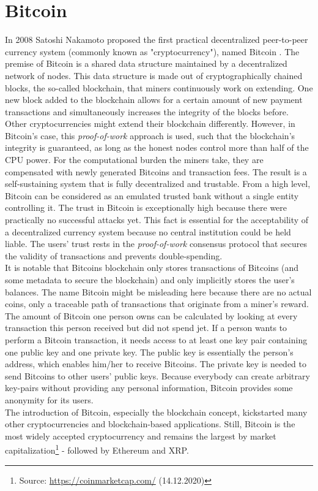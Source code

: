 \documentclass{cacthesis}
\newcounter{protocol}
\begin{document}
        \section{Bitcoin}
        In 2008 Satoshi Nakamoto proposed the first practical decentralized peer-to-peer currency system (commonly known as "cryptocurrency"), named Bitcoin \cite{nakamoto2009bitcoin}. The premise of Bitcoin is a shared data structure maintained by a decentralized network of nodes. This data structure is made out of cryptographically chained blocks, the so-called blockchain, that miners continuously work on extending. One new block added to the blockchain allows for a certain amount of new payment transactions and simultaneously increases the integrity of the blocks before. Other cryptocurrencies might extend their blockchain differently. However, in Bitcoin's case, this \textit{proof-of-work} approach is used, such that the blockchain's integrity is guaranteed, as long as the honest nodes control more than half of the CPU power. For the computational burden the miners take, they are compensated with newly generated Bitcoins and transaction fees. The result is a self-sustaining system that is fully decentralized and trustable. From a high level, Bitcoin can be considered as an emulated trusted bank without a single entity controlling it.  The trust in Bitcoin is exceptionally high because there were practically no successful attacks yet. This fact is essential for the acceptability of a decentralized currency system because no central institution could be held liable. The users' trust rests in the \textit{proof-of-work} consensus protocol that secures the validity of transactions and prevents double-spending. \\
        It is notable that Bitcoins blockchain only stores transactions of Bitcoins (and some metadata to secure the blockchain) and only implicitly stores the user's balances. The name Bitcoin might be misleading here because there are no actual coins, only a traceable path of transactions that originate from a miner's reward. The amount of Bitcoin one person owns can be calculated by looking at every transaction this person received but did not spend jet. If a person wants to perform a Bitcoin transaction, it needs access to at least one key pair containing one public key and one private key. The public key is essentially the person's address, which enables him/her to receive Bitcoins. The private key is needed to send Bitcoins to other users' public keys. Because everybody can create arbitrary key-pairs without providing any personal information, Bitcoin provides some anonymity for its users. \\
        The introduction of Bitcoin, especially the blockchain concept, kickstarted many other cryptocurrencies and blockchain-based applications. Still, Bitcoin is the most widely accepted cryptocurrency and remains the largest by market capitalization\footnote{Source: \url{https://coinmarketcap.com/} (14.12.2020)} - followed by Ethereum and XRP.
\end{document}
